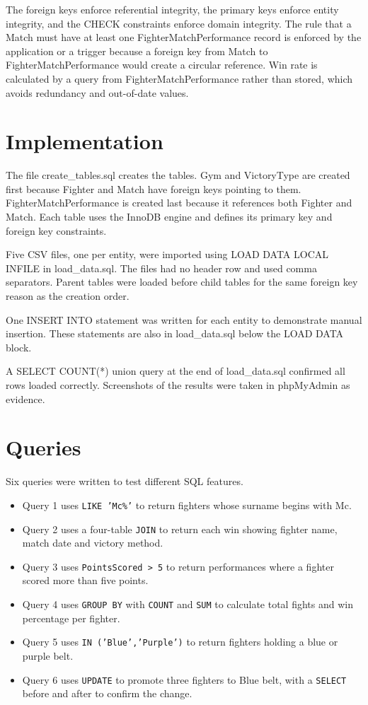 \documentclass[conference,9pt]{IEEEtran}
\begin{document}
The foreign keys enforce referential integrity, the primary keys enforce entity integrity, and the CHECK constraints enforce domain integrity. The rule that a Match must have at least one FighterMatchPerformance record is enforced by the application or a trigger because a foreign key from Match to FighterMatchPerformance would create a circular reference. Win rate is calculated by a query from FighterMatchPerformance rather than stored, which avoids redundancy and out-of-date values.

\clearpage
\section{Implementation}

The file create\_tables.sql creates the tables. Gym and VictoryType are created first because Fighter and Match have foreign keys pointing to them. FighterMatchPerformance is created last because it references both Fighter and Match. Each table uses the InnoDB engine and defines its primary key and foreign key constraints.

Five CSV files, one per entity, were imported using LOAD DATA LOCAL INFILE in load\_data.sql. The files had no header row and used comma separators. Parent tables were loaded before child tables for the same foreign key reason as the creation order.

One INSERT INTO statement was written for each entity to demonstrate manual insertion. These statements are also in load\_data.sql below the LOAD DATA block.

A SELECT COUNT(*) union query at the end of load\_data.sql confirmed all rows loaded correctly. Screenshots of the results were taken in phpMyAdmin as evidence.

\section{Queries}
Six queries were written to test different SQL features.

\begin{itemize}
  \item Query 1 uses \texttt{LIKE 'Mc\%'} to return fighters whose surname begins with Mc.
  \item Query 2 uses a four-table \texttt{JOIN} to return each win showing fighter name, match date and victory method.
  \item Query 3 uses \texttt{PointsScored > 5} to return performances where a fighter scored more than five points.
  \item Query 4 uses \texttt{GROUP BY} with \texttt{COUNT} and \texttt{SUM} to calculate total fights and win percentage per fighter.
  \item Query 5 uses \texttt{IN ('Blue','Purple')} to return fighters holding a blue or purple belt.
  \item Query 6 uses \texttt{UPDATE} to promote three fighters to Blue belt, with a \texttt{SELECT} before and after to confirm the change.
\end{itemize}
\end{document}
